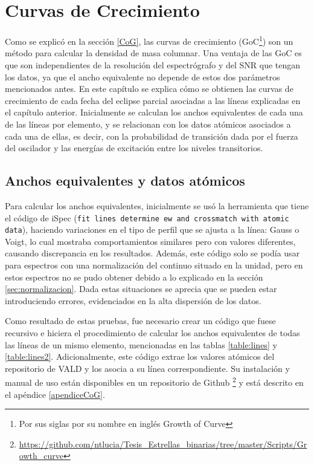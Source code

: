 \documentclass[12pt,oneside,openany,letter]{book}
\begin{document}
\chapter{Curvas de Crecimiento}\label{cap:Resultados}

Como se explicó en la sección \ref{CoG}, las curvas de crecimiento (GoC\footnote{Por sus siglas por su nombre en inglés Growth of Curve}) son un método para calcular la densidad de masa columnar. Una ventaja de las GoC es que son independientes de la resolución del espectrógrafo y del SNR que tengan los datos, ya que el ancho equivalente no depende de estos dos parámetros mencionados antes. En este capítulo se explica cómo se obtienen las curvas de crecimiento de cada fecha del eclipse parcial asociadas a las líneas explicadas en el capítulo anterior. Inicialmente se calculan los anchos equivalentes de cada una de las líneas por elemento, y se relacionan con los datos atómicos asociados a cada una de ellas, es decir, con la probabilidad de transición dada por el fuerza del oscilador y las energías de excitación entre los niveles transitorios.


\section{Anchos equivalentes y datos atómicos}

Para calcular los anchos equivalentes, inicialmente se usó la herramienta que tiene el código de iSpec (\texttt{fit lines determine ew and crossmatch with atomic data}), haciendo variaciones en el tipo de perfil que se ajusta  a la línea: Gauss o Voigt, lo cual mostraba comportamientos similares pero con valores diferentes, causando discrepancia en los resultados. Además, este código solo se podía usar para espectros con una normalización del continuo situado en la unidad, pero en estos espectros no se pudo obtener debido a lo explicado en la sección \ref{sec:normalizacion}. Dada estas situaciones se aprecia que se pueden estar introduciendo errores, evidenciados en la alta dispersión de los datos.


Como resultado de estas pruebas, fue necesario crear un código que fuese recursivo e hiciera el procedimiento de calcular los anchos equivalentes de todas las líneas de un mismo elemento, mencionadas en las tablas  \ref{table:lines} y \ref{table:lines2}. Adicionalmente, este código extrae los valores atómicos del repositorio de VALD y los asocia a su línea correspondiente. Su instalación y manual de uso están disponibles en un repositorio de Github  \footnote{\url{https://github.com/ntlucia/Tesis_Estrellas_binarias/tree/master/Scripts/Growth_curve}} y está descrito en el apéndice \ref{apendiceCoG}.
\end{document}
